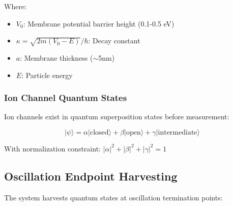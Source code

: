 \documentclass[11pt,a4paper]{article}
\begin{document}
Where:
\begin{itemize}
\item $V_0$: Membrane potential barrier height (0.1-0.5 eV)
\item $\kappa = \sqrt{2m(V_0-E)}/\hbar$: Decay constant
\item $a$: Membrane thickness ($\sim$5nm)
\item $E$: Particle energy
\end{itemize}

\subsubsection{Ion Channel Quantum States}

Ion channels exist in quantum superposition states before measurement:

\begin{equation}
|\psi\rangle = \alpha|\text{closed}\rangle + \beta|\text{open}\rangle + \gamma|\text{intermediate}\rangle
\end{equation}

With normalization constraint: $|\alpha|^2 + |\beta|^2 + |\gamma|^2 = 1$

\subsection{Oscillation Endpoint Harvesting}

The system harvests quantum states at oscillation termination points:
\end{document}
